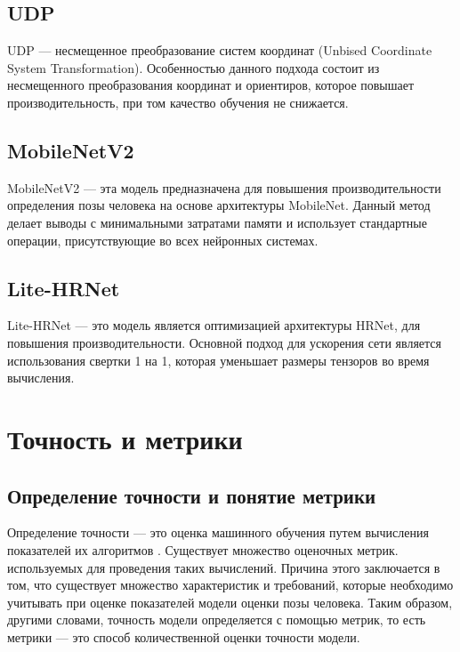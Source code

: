 \subsection{UDP}

UDP \cite{huang2020aid} --- несмещенное преобразование систем координат (Unbised Coordinate System Transformation). Особенностью данного подхода состоит из несмещенного преобразования координат и ориентиров, которое повышает производительность, при том качество обучения не снижается. 

\subsection{MobileNetV2}

MobileNetV2 \cite{MobileNetV2} --- эта модель предназначена для повышения производительности определения позы человека на основе архитектуры MobileNet. Данный метод делает выводы с минимальными затратами памяти и использует стандартные операции, присутствующие во всех нейронных системах.

\subsection{Lite-HRNet}

Lite-HRNet \cite{WangSCJDZLMTWLX19} --- это модель является оптимизацией архитектуры HRNet, для повышения производительности. Основной подход для ускорения сети является использования свертки 1 на 1, которая уменьшает размеры тензоров во время вычисления.

\section{Точность и метрики}

\subsection{Определение точности и понятие метрики}

Определение точности --- это оценка машинного обучения путем вычисления показателей их алгоритмов \cite{vyugin}. 
Существует множество оценочных метрик. используемых для проведения таких вычислений.
Причина этого заключается в том, что существует множество характеристик и требований, которые необходимо учитывать при оценке показателей модели оценки позы человека.
Таким образом, другими словами, точность модели определяется с помощью метрик, то есть метрики --- это способ количественной оценки точности модели.

